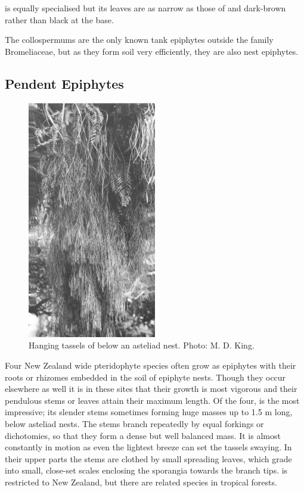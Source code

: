  is equally specialised but its leaves are as narrow as those of  and dark-brown rather than black at the base.

The collospermums are the only known tank epiphytes outside the family Bromeliaceae, but as they form soil very efficiently, they are also nest epiphytes.

\subsection{Pendent Epiphytes}

\begin{figure}
	\includegraphics[width=0.5\textwidth]{graphics/figure42lycopodium.jpg}
	\centering
	\caption[Hanging tassels of Lycopodium varium]{Hanging tassels of  below an asteliad nest.
	Photo: M. D. King.}
	\label{fig:42lycopodium}
\end{figure}

Four New Zealand wide pteridophyte species often grow as epiphytes with their roots or rhizomes embedded in the soil of epiphyte nests.
Though they occur elsewhere as well it is in these sites that their growth is most vigorous and their pendulous stems or leaves attain their maximum length.
Of the four,  is the most impressive; its slender stems sometimes forming huge masses up to 1.5 m long, below asteliad nests.
The stems branch repeatedly by equal forkings or dichotomies, so that they form a dense but well balanced mass.
It is almost constantly in motion as even the lightest breeze can set the tassels swaying.
In their upper parts the stems are clothed by small spreading leaves, which grade into small, close-set scales enclosing the sporangia towards the branch tips.  is restricted to New Zealand, but there are related species in tropical forests.

